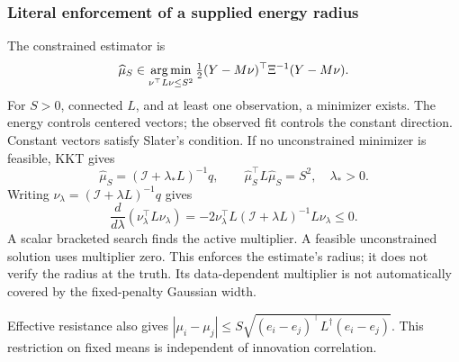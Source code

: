 \subsubsection{Literal enforcement of a supplied energy radius}
The constrained estimator is
\begin{equation}
\widehat\mu_S\in\operatorname*{arg\,min}_{\nu^\top L\nu\le S^2}
\tfrac12(Y-M\nu)^\top\Xi^{-1}(Y-M\nu).
\end{equation}
For $S>0$, connected $L$, and at least one observation, a minimizer exists. The energy controls centered vectors; the observed fit controls the constant direction. Constant vectors satisfy Slater's condition. If no unconstrained minimizer is feasible, KKT gives
\begin{equation}
\widehat\mu_S=(\mathcal I+\lambda_*L)^{-1}q,\qquad
\widehat\mu_S^\top L\widehat\mu_S=S^2,\quad\lambda_*>0.
\end{equation}
Writing $\nu_\lambda=(\mathcal I+\lambda L)^{-1}q$ gives
\[
\frac{d}{d\lambda}(\nu_\lambda^\top L\nu_\lambda)
=-2\nu_\lambda^\top L(\mathcal I+\lambda L)^{-1}L\nu_\lambda\le0.
\]
A scalar bracketed search finds the active multiplier. A feasible unconstrained solution uses multiplier zero. This enforces the estimate's radius; it does not verify the radius at the truth. Its data-dependent multiplier is not automatically covered by the fixed-penalty Gaussian width.

Effective resistance also gives $|\mu_i-\mu_j|\le S\sqrt{(e_i-e_j)^\top L^\dagger(e_i-e_j)}$. This restriction on fixed means is independent of innovation correlation.

